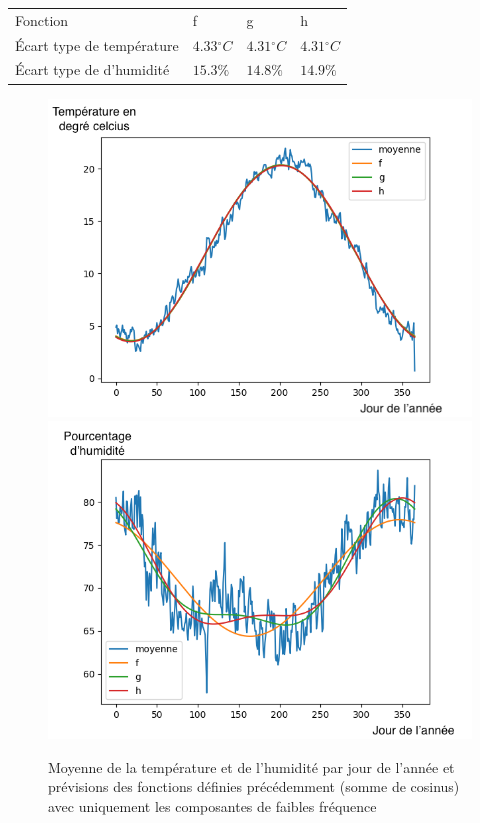\documentclass[11pt,a4paper]{article}
\begin{document}
\begin{tabular}{llll}\hline
\hline
Fonction                             &f                         &g                       &h \\
Écart type de température & $4.33{}^{\circ}C$   & $4.31{}^{\circ}C$   &  $4.31{}^{\circ}C$ \\ 
Écart type de d'humidité    & $15.3\%$   & $14.8\%$   &  $14.9\%$   \\   
\hline 
\end{tabular}

\begin{figure} [H]
\centering
\includegraphics[width=0.48 \textwidth]{./imagesTIPE/CourbeAnneeT.png}\quad
\includegraphics[width=0.48 \textwidth]{./imagesTIPE/CourbeAnneeH.png}
\caption{\label{fig:190101Lolita} Moyenne de la température et de l'humidité par jour de l'année et prévisions des fonctions définies précédemment (somme de cosinus) avec uniquement les composantes de faibles fréquence}
\end{figure}
\end{document}
